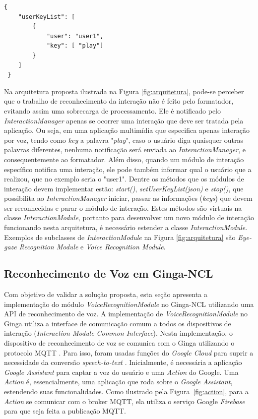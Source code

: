 \begin{lstlisting}[language=ncl,label=lst:json-exemplo, caption={Exemplo de JSON que usa o modelo para mapeamento de reconhecimento de voz para a Listagem~\ref{lst:ncl_multmodal}.}]
 {
    "userKeyList": [
        {
            "user": "user1",
            "key": [ "play"]
        }
    ]
 }
\end{lstlisting}



Na arquitetura proposta ilustrada na Figura \ref{fig:arquitetura}, pode-se perceber que o trabalho de reconhecimento da interação não é feito pelo formatador, evitando assim uma sobrecarga de processamento. Ele é notificado pelo \textit{InteractionManager} apenas se ocorrer uma interação que deve ser tratada pela aplicação. Ou seja, em uma aplicação multimídia que especifica apenas interação por voz, tendo como \textit{key} a palavra "\textit{play}", caso o usuário diga quaisquer outras palavras diferentes, nenhuma notificação será enviada ao \textit{InteractionManager}, e consequentemente ao formatador. Além disso, quando um módulo de interação específico notifica uma interação, ele pode também informar qual o usuário que a realizou, que no exemplo seria o "user1". Dentre os métodos que os módulos de interação devem implementar estão: \textit{start()}, \textit{setUserKeyList(json)} e \textit{stop()}, que possibilita ao \textit{InteractionManager} iniciar, passar as informações (\textit{keys}) que devem ser reconhecidas e parar o módulo de interação. Estes métodos são virtuais na classe \textit{InteractionModule}, portanto para desenvolver um novo módulo de interação funcionando nesta arquitetura, é necessário estender a classe \textit{InteractionModule}. Exemplos de subclasses de \textit{InteractionModule} na Figura \ref{fig:arquitetura} são \textit{Eye-gaze Recognition Module} e \textit{Voice Recognition Module}. 

\subsection{Reconhecimento de Voz em Ginga-NCL}

Com objetivo de validar a solução proposta, esta seção apresenta a implementação do módulo \textit{VoiceRecognitionModule} no Ginga-NCL utilizando uma API de reconhecimento de voz. A implementação de \textit{VoiceRecognitionModule} no Ginga utiliza a interface de comunicação comum a todos os dispositivos de interação (\textit{Interaction Module Common Interface}). Nesta implementação, o dispositivo de reconhecimento de voz se comunica com o Ginga utilizando o protocolo MQTT \cite{hunkeler2008mqtt}. Para isso, foram usadas funções do \textit{Google Cloud} para suprir a necessidade da conversão \textit{speech-to-text} \cite{bijl2001speech}. Inicialmente, é necessária a aplicação \textit{Google Assistant} para captar a voz do usuário e uma \textit{Action} do Google. Uma \textit{Action} é, essencialmente, uma aplicação que roda sobre o \textit{Google Assistant}, estendendo suas funcionalidades. Como ilustrado pela Figura~\ref{fig:action}, para a \textit{Action} se comunicar com o broker MQTT, ela utiliza o serviço Google \textit{Firebase} para que seja feita a publicação MQTT. 

